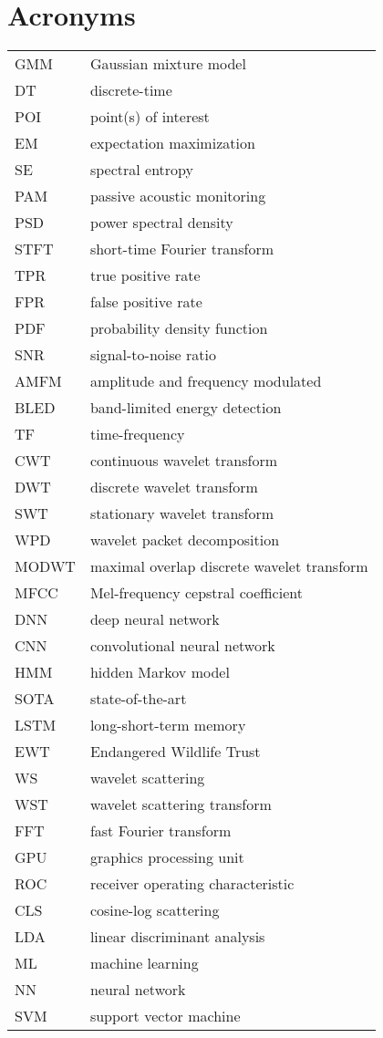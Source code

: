 \section*{Acronyms}
\begin{tabular}{p{} p{}}
    GMM & Gaussian mixture model \\
    DT & discrete-time \\
    POI & point(s) of interest \\
    EM & expectation maximization \\
    SE & spectral entropy \\
    PAM & passive acoustic monitoring \\
    PSD & power spectral density \\
    STFT & short-time Fourier transform \\
    TPR & true positive rate \\
    FPR & false positive rate \\
    PDF & probability density function \\
    SNR & signal-to-noise ratio \\
    AMFM & amplitude and frequency modulated \\
    BLED & band-limited energy detection \\
    TF & time-frequency \\
    CWT & continuous wavelet transform \\
    DWT & discrete wavelet transform \\
    SWT & stationary wavelet transform \\
    WPD & wavelet packet decomposition \\
    MODWT & maximal overlap discrete wavelet transform \\
    MFCC & Mel-frequency cepstral coefficient \\
    DNN & deep neural network \\
    CNN & convolutional neural network \\
    HMM & hidden Markov model \\
    SOTA & state-of-the-art \\
    LSTM & long-short-term memory \\
    EWT & Endangered Wildlife Trust \\
    WS & wavelet scattering \\
    WST & wavelet scattering transform \\
    FFT & fast Fourier transform \\
    GPU & graphics processing unit \\
    ROC & receiver operating characteristic \\
    CLS & cosine-log scattering \\
    LDA & linear discriminant analysis \\
    ML & machine learning \\
    NN & neural network \\
    SVM & support vector machine \\
\end{tabular}

